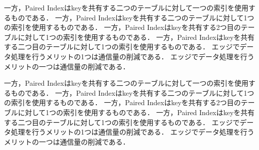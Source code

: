 一方，Paired Indexはkeyを共有する二つのテーブルに対して一つの索引を使用するものである．
一方，Paired Indexはkeyを共有する二つのテーブルに対して1つの索引を使用するものである．
一方，Paired Indexはkeyを共有する2つ目のテーブルに対して1つの索引を使用するものである．
一方，Paired Indexはkeyを共有する二つ目のテーブルに対して1つの索引を使用するものである．
エッジでデータ処理を行うメリットの1つは通信量の削減である．
エッジでデータ処理を行うメリットの一つは通信量の削減である．

一方，Paired Indexはkeyを共有する二つのテーブルに対して一つの索引を使用するものである．
一方，Paired Indexはkeyを共有する二つのテーブルに対して1つの索引を使用するものである．
一方，Paired Indexはkeyを共有する2つ目のテーブルに対して1つの索引を使用するものである．
一方，Paired Indexはkeyを共有する二つ目のテーブルに対して1つの索引を使用するものである．
エッジでデータ処理を行うメリットの1つは通信量の削減である．
エッジでデータ処理を行うメリットの一つは通信量の削減である．